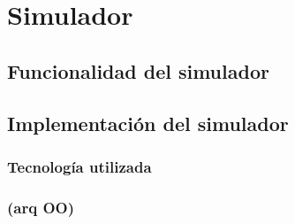 \chapter{Simulador \qsim}


\section{Funcionalidad del simulador}


\section{Implementación del simulador}
\subsection{Tecnología utilizada}
\subsection{ (arq OO)}



